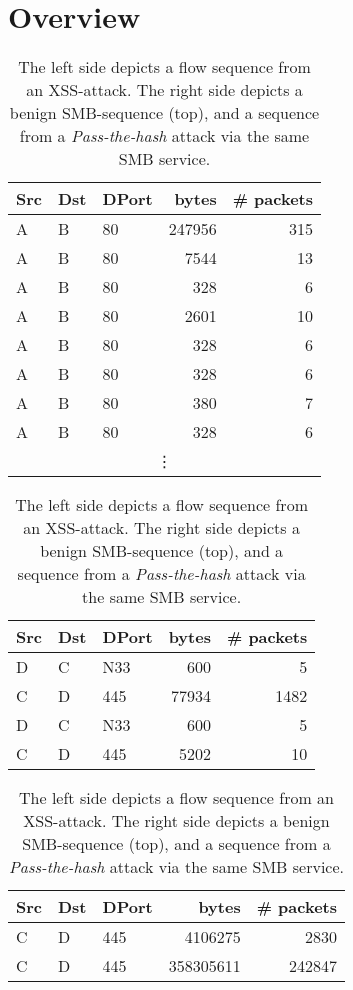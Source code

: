 \section{Overview}\label{Sec:Over}


\begin{table}[ht]
\centering
\begin{footnotesize}
\begin{subtable}{.3\textwidth}
\begin{tabular}{l l l r r}
Src&Dst&DPort&bytes&\# packets\\ \hline
A&B&80&247956&315\\ 
A&B&80&7544&13\\ 
A&B&80&328&6\\ 
A&B&80&2601&10\\ 
A&B&80&328&6\\ 
A&B&80&328&6\\ 
A&B&80&380&7\\
A&B&80&328&6\\
\multicolumn{5}{c}{\vdots}
\end{tabular}
\caption{XSS-attack, A=192.168.10.50, B= 172.16.0.1}\label{Tab:XSS}
\end{subtable}
\quad
\begin{subtable}{.3\textwidth}
\begin{tabular}{l l l r r}
Src&Dst&DPort&bytes&\# packets\\ \hline
D&C&N33&600&5\\ 
C&D&445&77934&1482\\ 
D&C&N33&600&5\\ 
C&D&445&5202&10\\  
\end{tabular}
\caption{Benign SMB, C=C6267, D=C754}\label{Tab:SMB}

\begin{tabular}{l l l r r}
Src&Dst&DPort&bytes&\# packets\\ \hline
C&D&445&4106275&2830\\ 
C&D&445&358305611&242847\\ 
\end{tabular}
\caption{\textit{Pass-the-hash} attack via SMB}\label{Tab:PTH}
\end{subtable}
\end{footnotesize}
\caption{The left side depicts a flow sequence from an XSS-attack.%
The right side depicts a benign SMB-sequence (top), and a sequence from a \textit{Pass-the-hash} attack via the same SMB service.}
\end{table}


